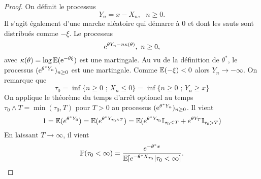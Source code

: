 \begin{proof}
On définit le processus 
$$
Y_n = x - X_n,\text{ }n\geq0.
$$
Il s'agit également d'une marche aléatoire qui démarre à $0$ et dont les sauts sont distribués comme $-\xi$. Le processus 
$$
\mathrm{e}^{\theta Y_n - n\kappa(\theta)},\text{ }n\geq0,
$$
avec $\kappa(\theta) = \log\mathbb{E}(\mathrm{e}^{-\theta\xi})$ est une martingale. Au vu de la définition de $\theta^\ast$, le processus $(\mathrm{e}^{\theta^\ast Y_n})_{n\geq 0}$ est une martingale. Comme $\mathbb{E}(-\xi) <0$ alors $Y_n\rightarrow -\infty$. On remarque que 
$$
\tau_0 = \inf\{n\geq0\text{ ; }X_n\leq0\} = \inf\{n\geq0\text{ ; }Y_n\geq x\}
$$ 
On applique le théorème du temps d'arrêt optionel au temps $\tau_0\land T = \min(\tau_0,T)$ pour $T>0$ au processus $(\mathrm{e}^{\theta^\ast Y_n})_{n\geq 0}$. Il vient 
$$
1 = \mathbb{E}(e^{\theta^{\ast}Y_0}) = \mathbb{E}(e^{\theta^{\ast}Y_{\tau_0\land T}}) = \mathbb{E}(e^{\theta^\ast Y_{\tau_0}}\mathbb{I}_{\tau_0\leq T} + e^{\theta Y_T}\mathbb{I}_{\tau_0>T})
$$
En laissant $T\rightarrow \infty$, il vient 
$$
\mathbb{P}(\tau_0<\infty) = \frac{e^{-\theta^\ast x}}{\mathbb{E}[e^{-\theta^\ast X_{\tau_0}}|\tau_0 <\infty]}.
$$
\end{proof}


\newpage